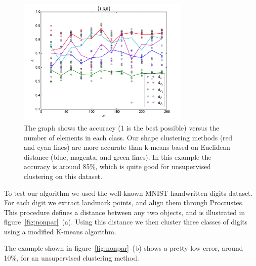 \documentclass[simplex.tex]{subfiles}
\begin{document}
\begin{figure}[h!]
\begin{cframed}
\centering
\includegraphics[width=0.75\textwidth]{../../figs/nonpar135.png}
\caption{
The graph shows the accuracy
(1 is the best possible) versus the number of elements in each class.
Our shape clustering methods (red and cyan lines) are more accurate than
k-means based on Euclidean distance (blue, magenta, and green lines). In
this example the accuracy is around 85\%, which is quite good for
unsupervised clustering on this dataset.
}
\label{fig:nonpar135}
\end{cframed}
\end{figure}

To test our algorithm we used the well-known MNIST handwritten digits
dataset. For each digit we extract landmark points, and align them
through Procrustes. This procedure defines a distance between any two
objects, and is illustrated in figure~\ref{fig:nonpar}~(a). Using this
distance we then cluster three classes of digits using a modified
K-means algorithm. 

The example shown in figure~\ref{fig:nonpar}~(b)
shows a pretty low error, around 10\%, for an unsupervised clustering
method.
\end{document}
